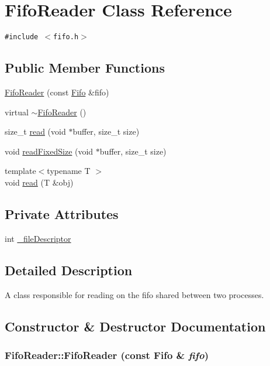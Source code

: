 \hypertarget{classFifoReader}{
\section{FifoReader Class Reference}
\label{classFifoReader}
}
{\tt \#include $<$fifo.h$>$}

\subsection*{Public Member Functions}
\begin{CompactItemize}
\item 
\hyperlink{classFifoReader_6634431a038ffa4281c6eef7397cabae}{FifoReader} (const \hyperlink{classFifo}{Fifo} \&fifo)
\item 
virtual \hyperlink{classFifoReader_38ab41237521a8dcdb6ce8ef41ed0537}{$\sim$FifoReader} ()
\item 
size\_\-t \hyperlink{classFifoReader_cff266ab8fb625353fb8cdf866d91674}{read} (void $\ast$buffer, size\_\-t size)
\item 
void \hyperlink{classFifoReader_0731d94742fb3dddf17f8a2343b235fb}{readFixedSize} (void $\ast$buffer, size\_\-t size)
\item 
{\footnotesize template$<$typename T $>$ }\\void \hyperlink{classFifoReader_21acedc956fdb98f23a2ba069cae3fe1}{read} (T \&obj)
\end{CompactItemize}
\subsection*{Private Attributes}
\begin{CompactItemize}
\item 
int \hyperlink{classFifoReader_9836b5e989e4e977b331bdd43f481cd5}{\_\-fileDescriptor}
\end{CompactItemize}


\subsection{Detailed Description}
A class responsible for reading on the fifo shared between two processes. 

\subsection{Constructor \& Destructor Documentation}
\hypertarget{classFifoReader_6634431a038ffa4281c6eef7397cabae}{
\subsubsection[{FifoReader}]{\setlength{\rightskip}{0pt plus 5cm}FifoReader::FifoReader (const {\bf Fifo} \& {\em fifo})}}
\label{classFifoReader_6634431a038ffa4281c6eef7397cabae}


